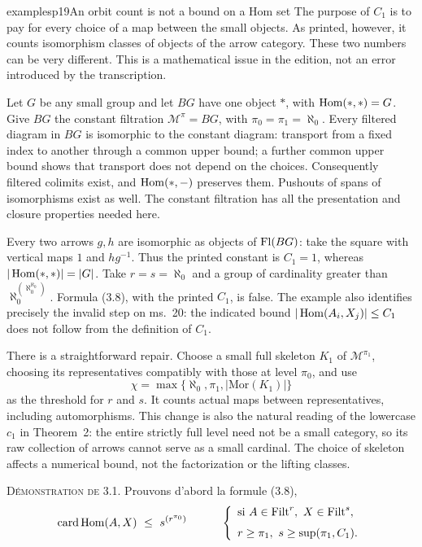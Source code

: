\begin{dcomment}{examples}{p19}{An orbit count is not a bound on a Hom set}
The purpose of $C_1$ is to pay for every choice of a map between the small objects. As printed, however, it counts isomorphism classes of objects of the arrow category. These two numbers can be very different. This is a mathematical issue in the edition, not an error introduced by the transcription.

Let $G$ be any small group and let $BG$ have one object $*$, with $\operatorname{Hom}(*,*)=G$. Give $BG$ the constant filtration $\mathcal M^\pi=BG$, with $\pi_0=\pi_1=\aleph_0$. Every filtered diagram in $BG$ is isomorphic to the constant diagram: transport from a fixed index to another through a common upper bound; a further common upper bound shows that transport does not depend on the choices. Consequently filtered colimits exist, and $\operatorname{Hom}(*,-)$ preserves them. Pushouts of spans of isomorphisms exist as well. The constant filtration has all the presentation and closure properties needed here.

Every two arrows $g,h$ are isomorphic as objects of $\mathrm{Fl}(BG)$: take the square with vertical maps $1$ and $hg^{-1}$. Thus the printed constant is $C_1=1$, whereas $|\operatorname{Hom}(*,*)|=|G|$. Take $r=s=\aleph_0$ and a group of cardinality greater than $\aleph_0^{(\aleph_0^{\aleph_0})}$. Formula (3.8), with the printed $C_1$, is false. The example also identifies precisely the invalid step on ms.~20: the indicated bound $|\operatorname{Hom}(A_i,X_j)|\leq C_1$ does not follow from the definition of $C_1$.

There is a straightforward repair. Choose a small full skeleton $K_1$ of $\mathcal M^{\pi_1}$, choosing its representatives compatibly with those at level $\pi_0$, and use
\[
\chi=\max\{\aleph_0,\pi_1,|\mathrm{Mor}(K_1)|\}
\]
as the threshold for $r$ and $s$. It counts actual maps between representatives, including automorphisms. This change is also the natural reading of the lowercase $c_1$ in Theorem~2: the entire strictly full level need not be a small category, so its raw collection of arrows cannot serve as a small cardinal. The choice of skeleton affects a numerical bound, not the factorization or the lifting classes.
\end{dcomment}


\textsc{Démonstration de} 3.1. Prouvons d'abord la formule (3.8),
\[
\card\Hom(A,X)\ \leq\ s^{(r^{\pi_0})}\qquad\quad
\left\{\begin{array}{l}
\text{si } A\in\Filt^r,\ X\in\Filt^s,\\[1.5ex]
r\geq\pi_1,\ s\geq\sup(\pi_1,C_1).
\end{array}\right.
\]

